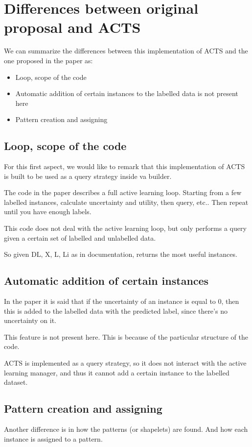 \section{Differences between original proposal and ACTS}
We can summarize the differences between this implementation of ACTS and 
the one proposed in the paper as:
\begin{itemize}
    \item Loop, scope of the code
    \item Automatic addition of certain instances to the labelled data is not
    present here
    \item Pattern creation and assigning
\end{itemize}

\subsection{Loop, scope of the code}
For this first aspect, we would like to remark that this implementation of ACTS is 
built to be used as a query strategy inside va builder.

The code in the paper describes a full active learning loop. Starting from a few labelled instances, 
calculate uncertainty and utility, then query, etc.. Then repeat until you have enough labels.

This code does not deal with the active learning loop, but only performs a query given a certain 
set of labelled and unlabelled data. 

So given DL, X, L, Li as in documentation, returns the most useful instances.

\subsection{Automatic addition of certain instances}
In the paper it is said that if the uncertainty of an instance is equal to 0, then 
this is added to the labelled data with the predicted label, since there's no uncertainty
on it.

This feature is not present here. This is because of the particular structure of the code.

ACTS is implemented as a query strategy, so it does not interact with the active learning
manager, and thus it cannot add a certain instance to the labelled dataset.

\subsection{Pattern creation and assigning}
Another difference is in how the patterns (or shapelets) are found. And how each instance 
is assigned to a pattern.

